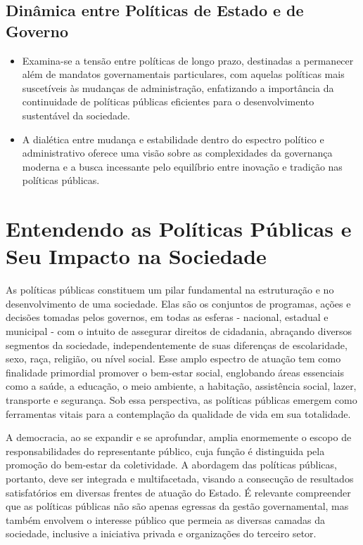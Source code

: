 \documentclass[
   article,       
   12pt,          
   oneside,       
   a4paper,       
   english,       
   brazil,        
   sumario=tradicional
   ]{abntex2}
\begin{document}
\subsection{Dinâmica entre Políticas de Estado e de Governo}
\begin{itemize}
    \item Examina-se a tensão entre políticas de longo prazo, destinadas a permanecer além de mandatos governamentais particulares, com aquelas políticas mais suscetíveis às mudanças de administração, enfatizando a importância da continuidade de políticas públicas eficientes para o desenvolvimento sustentável da sociedade.
    \item A dialética entre mudança e estabilidade dentro do espectro político e administrativo oferece uma visão sobre as complexidades da governança moderna e a busca incessante pelo equilíbrio entre inovação e tradição nas políticas públicas.
\end{itemize}
\section{Entendendo as Políticas Públicas e Seu Impacto na Sociedade}

As políticas públicas constituem um pilar fundamental na estruturação e no desenvolvimento de uma sociedade. Elas são os conjuntos de programas, ações e decisões tomadas pelos governos, em todas as esferas - nacional, estadual e municipal - com o intuito de assegurar direitos de cidadania, abraçando diversos segmentos da sociedade, independentemente de suas diferenças de escolaridade, sexo, raça, religião, ou nível social. Esse amplo espectro de atuação tem como finalidade primordial promover o bem-estar social, englobando áreas essenciais como a saúde, a educação, o meio ambiente, a habitação, assistência social, lazer, transporte e segurança. Sob essa perspectiva, as políticas públicas emergem como ferramentas vitais para a contemplação da qualidade de vida em sua totalidade.

A democracia, ao se expandir e se aprofundar, amplia enormemente o escopo de responsabilidades do representante público, cuja função é distinguida pela promoção do bem-estar da coletividade. A abordagem das políticas públicas, portanto, deve ser integrada e multifacetada, visando a consecução de resultados satisfatórios em diversas frentes de atuação do Estado. É relevante compreender que as políticas públicas não são apenas egressas da gestão governamental, mas também envolvem o interesse público que permeia as diversas camadas da sociedade, inclusive a iniciativa privada e organizações do terceiro setor.
\end{document}
